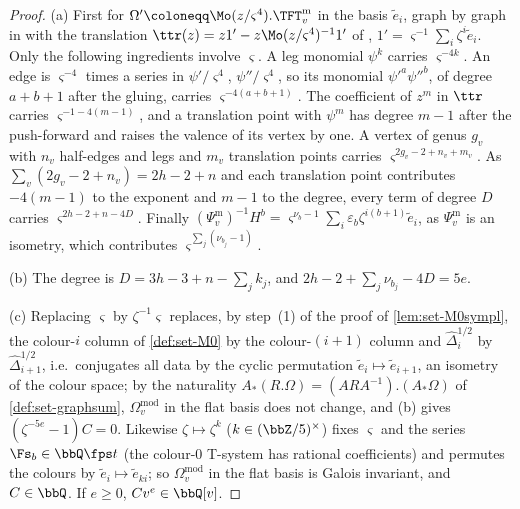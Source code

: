 \begin{proof}
(a) First for $\Omega'\coloneqq\Mo(z/\varsigma^4).\TFT^{\mathrm m}_v$ in the basis $\tilde e_i$, graph by graph in \cite[Def.~2.2]{PPZ15} with the translation $\ttr(z)=z1'-z\Mo(z/\varsigma^4)^{-1}1'$ of \cite[Def.~2.13]{PPZ15}, $1'=\varsigma^{-1}\sum_i\zeta^i\tilde e_i$. Only the following ingredients involve $\varsigma$. A leg monomial $\psi^k$ carries $\varsigma^{-4k}$. An edge is $\varsigma^{-4}$ times a series in $\psi'/\varsigma^4$, $\psi''/\varsigma^4$, so its monomial $\psi'^a\psi''^b$, of degree $a+b+1$ after the gluing, carries $\varsigma^{-4(a+b+1)}$. The coefficient of $z^m$ in $\ttr$ carries $\varsigma^{-1-4(m-1)}$, and a translation point with $\psi^m$ has degree $m-1$ after the push-forward and raises the valence of its vertex by one. A vertex of genus $g_v$ with $n_v$ half-edges and legs and $m_v$ translation points carries $\varsigma^{2g_v-2+n_v+m_v}$. As $\sum_v(2g_v-2+n_v)=2h-2+n$ and each translation point contributes $-4(m-1)$ to the exponent and $m-1$ to the degree, every term of degree $D$ carries $\varsigma^{2h-2+n-4D}$. Finally $(\Psi^{\mathrm m}_v)^{-1}H^b=\varsigma^{\nu_b-1}\sum_i\varepsilon_b\zeta^{i(b+1)}\tilde e_i$, as $\Psi^{\mathrm m}_v$ is an isometry, which contributes $\varsigma^{\sum_j(\nu_{b_j}-1)}$.

(b) The degree is $D=3h-3+n-\sum_jk_j$, and $2h-2+\sum_j\nu_{b_j}-4D=5e$.

(c) Replacing $\varsigma$ by $\zeta^{-1}\varsigma$ replaces, by step~(1) of the proof of \cref{lem:set-M0sympl}, the colour-$i$ column of \cref{def:set-M0} by the colour-$(i+1)$ column and $\hat\Delta_i^{1/2}$ by $\hat\Delta_{i+1}^{1/2}$, i.e.\ conjugates all data by the cyclic permutation $\tilde e_i\mapsto\tilde e_{i+1}$, an isometry of the colour space; by the naturality $A_*(R.\Omega)=(ARA^{-1}).(A_*\Omega)$ of \cref{def:set-graphsum}, $\Omega^{\mathrm{mod}}_v$ in the flat basis does not change, and (b) gives $(\zeta^{-5e}-1)C=0$. Likewise $\zeta\mapsto\zeta^k$ ($k\in(\bbZ/5)^\times$) fixes $\varsigma$ and the series $\Fs_b\in\bbQ\fps t$ (the colour-$0$ T-system has rational coefficients) and permutes the colours by $\tilde e_i\mapsto\tilde e_{ki}$; so $\Omega^{\mathrm{mod}}_v$ in the flat basis is Galois invariant, and $C\in\bbQ$. If $e\geq0$, $Cv^e\in\bbQ[v]$.
\end{proof}


